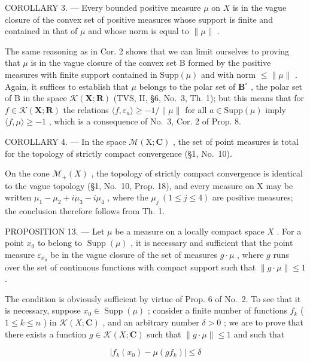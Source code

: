COROLLARY 3. --- Every bounded positive measure \(\mu\) on \(X\) is in the vague closure of the convex set of positive measures whose support is finite and contained in that of \(\mu\) and whose norm is equal to \(\|\mu\|\) .

The same reasoning as in Cor. 2 shows that we can limit ourselves to proving that \(\mu\) is in the vague closure of the convex set B formed by the positive measures with finite support contained in \(\mathrm{Supp}(\mu)\) and with norm \(\leqslant \| \mu \|\) . Again, it suffices to establish that \(\mu\) belongs to the polar set of \(\mathbf{B}^{\circ}\) , the polar set of B in the space \(\mathcal{K}(\mathbf{X};\mathbf{R})\) (TVS, II, §6, No.~3, Th. 1); but this means that for \(f\in \mathcal{K}(\mathbf{X};\mathbf{R})\) the relations \(\langle f,\varepsilon_a\rangle \geqslant -1 / \| \mu \|\) for all \(a\in \mathrm{Supp}(\mu)\) imply \(\langle f,\mu \rangle \geqslant -1\) , which is a consequence of No.~3, Cor. 2 of Prop. 8.

COROLLARY 4. --- In the space \(\mathcal{M}(\mathrm{X};\mathbf{C})\) , the set of point measures is total for the topology of strictly compact convergence (§1, No.~10).

On the cone \(\mathcal{M}_{+}(X)\) , the topology of strictly compact convergence is identical to the vague topology (§1, No.~10, Prop. 18), and every measure on X may be written \(\mu_{1}-\mu_{2}+i\mu_{3}-i\mu_{4}\) , where the \(\mu_{j}\ (1\leqslant j\leqslant4)\) are positive measures; the conclusion therefore follows from Th. 1.

PROPOSITION 13. --- Let \(\mu\) be a measure on a locally compact space \(X\) . For a point \(x_0\) to belong to \(\operatorname{Supp}(\mu)\) , it is necessary and sufficient that the point measure \(\varepsilon_{x_0}\) be in the vague closure of the set of measures \(g \cdot \mu\) , where \(g\) runs over the set of continuous functions with compact support such that \(\| g \cdot \mu \| \leqslant 1\) .

The condition is obviously sufficient by virtue of Prop. 6 of No.~2. To see that it is necessary, suppose \(x_0 \in \operatorname{Supp}(\mu)\) ; consider a finite number of functions \(f_k\) ( \(1 \leqslant k \leqslant n\) ) in \(\mathcal{K}(X; \mathbf{C})\) , and an arbitrary number \(\delta > 0\) ; we are to prove that there exists a function \(g \in \mathcal{K}(X; \mathbf{C})\) such that \(\| g \cdot \mu \| \leqslant 1\) and such that

\[
\left| f _ {k} \left(x _ {0}\right) - \mu \left(g f _ {k}\right) \right| \leqslant \delta
\]

